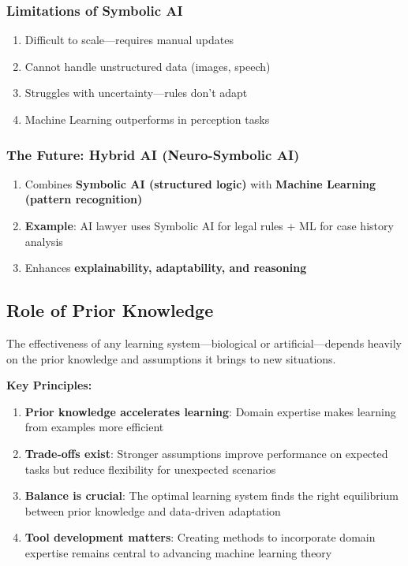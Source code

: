 \subsubsection{Limitations of Symbolic AI}
\label{subsubsec:symbolic-limitations}

\begin{enumerate}
\item Difficult to scale—requires manual updates
\item Cannot handle unstructured data (images, speech)
\item Struggles with uncertainty—rules don't adapt
\item Machine Learning outperforms in perception tasks
\end{enumerate}

\subsubsection{The Future: Hybrid AI (Neuro-Symbolic AI)}
\label{subsubsec:hybrid-ai}

\begin{enumerate}
\item Combines \textbf{Symbolic AI (structured logic)} with \textbf{Machine Learning (pattern recognition)}
\item \textbf{Example}: AI lawyer uses Symbolic AI for legal rules + ML for case history analysis
\item Enhances \textbf{explainability, adaptability, and reasoning}
\end{enumerate}

\subsection{Role of Prior Knowledge}
\label{subsec:prior-knowledge}

The effectiveness of any learning system—biological or artificial—depends heavily on the prior knowledge and assumptions it brings to new situations.

\textbf{Key Principles:}

\begin{enumerate}
\item \textbf{Prior knowledge accelerates learning}: Domain expertise makes learning from examples more efficient
\item \textbf{Trade-offs exist}: Stronger assumptions improve performance on expected tasks but reduce flexibility for unexpected scenarios  
\item \textbf{Balance is crucial}: The optimal learning system finds the right equilibrium between prior knowledge and data-driven adaptation
\item \textbf{Tool development matters}: Creating methods to incorporate domain expertise remains central to advancing machine learning theory
\end{enumerate}

